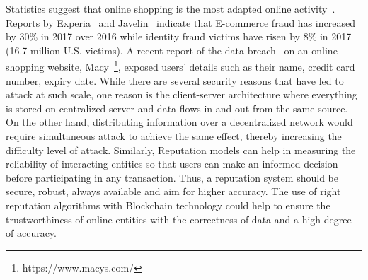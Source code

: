 Statistics suggest that online shopping is the most adapted online
activity~\cite{experian}. Reports by Experia~\cite{experian} and
Javelin~\cite{javelin} indicate that E-commerce fraud has increased by 30\% in
2017 over 2016 while identity fraud victims have risen by 8\% in 2017 (16.7
million U.S. victims). A recent report of the data breach~\cite{macy} on an
online shopping website, Macy~\footnote{https://www.macys.com/}, exposed users’
details such as their name, credit card number, expiry date. While there are
several security reasons that have led to attack at such scale, one reason is
the client-server architecture where everything is stored on centralized server
and data flows in and out from the same source. On the other hand, distributing
information over a decentralized network would require simultaneous attack to
achieve the same effect, thereby increasing the difficulty level of attack.
Similarly, Reputation models can help in measuring the reliability of
interacting entities so that users can make an informed decision before
participating in any transaction. Thus, a reputation system should be secure,
robust, always available and aim for higher accuracy. The use of right
reputation algorithms with Blockchain technology could help to ensure the
trustworthiness of online entities with the correctness of data and a high
degree of accuracy. 
